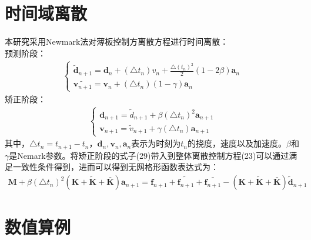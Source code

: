 \documentclass[a4paper]{article}
\begin{document}
\section{时间域离散}
本研究采用Newmark法对薄板控制方离散方程进行时间离散：\\
预测阶段：
\begin{equation}
 \begin{split}
    \begin{cases}
        \tilde{\pmb{d}}_{n+1}=\pmb{d}_n+(\triangle t_n)v_n+\frac{\triangle (t_n)^2}{2}(1-2\beta)\pmb a_n\\
        \tilde{\pmb v_{n+1}}=\pmb{v}_n+(\triangle t_n)(1-\gamma)\pmb{a}_n
    \end{cases}
  \end{split}
\end{equation}
矫正阶段：
\begin{equation}
\begin{split}
    \begin{cases}
    \pmb{d}_{n+1}=\tilde{d}_{n+1}+\beta(\triangle t_n)^2\pmb a_{n+1}\\
    \pmb v_{n+1}=\tilde{v}_{n+1}+\gamma(\triangle t_n)\pmb{a}_{n+1}
    \end{cases}
\end{split}
\end{equation}
其中，$\triangle t_n=t_{n+1}-t_n$，$\pmb{d}_n,\pmb{v}_n,\pmb a_n$表示为时刻为$t_n$的挠度，速度以及加速度。$\beta$和$\gamma$是Nemark参数。将矫正阶段的式子(29)带入到整体离散控制方程(23)可以通过满足一致性条件得到，进而可以得到无网格形函数表达式为：
\begin{equation}
\begin{split}
\pmb{M}+\beta(\triangle t_n)^2(\pmb{K}+\pmb{\tilde{K}}+\pmb{\bar{K}})\pmb{a}_{n+1}=\pmb{f}_{n+1}+\tilde{\pmb{f}_{n+1}}+\bar{\pmb{f}_{n+1}}-(\pmb{K}+\pmb{\tilde{K}}+\pmb{\bar{K}})\pmb{\tilde{d}}_{n+1}
\end{split}
\end{equation}






    \section{数值算例}
\end{document}
